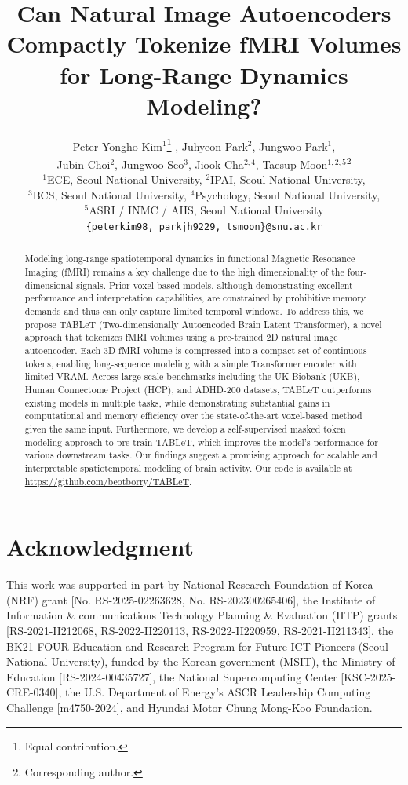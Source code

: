 \documentclass[10pt,twocolumn,letterpaper]{article}
\title{Can Natural Image Autoencoders Compactly Tokenize fMRI Volumes \\for Long-Range Dynamics Modeling?}
\author{Peter Yongho Kim$^{1}$\thanks{Equal contribution.} , Juhyeon Park$^{2}$\footnotemark[1] , Jungwoo Park$^{1}$, \\Jubin Choi$^{2}$, Jungwoo Seo$^{3}$, Jiook Cha$^{2,4}$, Taesup Moon$^{1,2,5}$\thanks{Corresponding author.} \\
$^{1}$ECE, Seoul National University,
$^{2}$IPAI, Seoul National University, \\
$^{3}$BCS, Seoul National University,
$^{4}$Psychology, Seoul National University, \\
$^{5}$ASRI / INMC / AIIS, Seoul National University\\
\texttt{\{peterkim98, parkjh9229, tsmoon\}@snu.ac.kr} \\
}
\newcommand{\ours}{TABLeT}
\begin{document}
\maketitle


\begin{abstract}
Modeling long-range spatiotemporal dynamics in functional Magnetic Resonance Imaging (fMRI) remains a key challenge due to the high dimensionality of the four-dimensional signals. 
Prior voxel-based models, although demonstrating excellent performance and interpretation capabilities, are constrained by prohibitive memory demands and thus can only capture limited temporal windows. 
To address this, we propose TABLeT (Two-dimensionally Autoencoded Brain Latent Transformer), a novel approach that tokenizes fMRI volumes using a pre-trained 2D natural image autoencoder. Each 3D fMRI volume is compressed into a compact set of continuous tokens, enabling long-sequence modeling with a simple Transformer encoder with limited VRAM. Across large-scale benchmarks including the UK-Biobank (UKB), Human Connectome Project (HCP), and ADHD-200 datasets, TABLeT outperforms existing models in multiple tasks, while demonstrating substantial gains in computational and memory efficiency over the state-of-the-art voxel-based method given the same input. 
Furthermore, we develop a self-supervised masked token modeling approach to pre-train {\ours}, which improves the model's performance for various downstream tasks.
Our findings suggest a promising approach for scalable and interpretable spatiotemporal modeling of brain activity.
Our code is available at \url{https://github.com/beotborry/TABLeT}.
\end{abstract}







\section*{Acknowledgment}
This work was supported in part by National Research Foundation of Korea (NRF) grant
[No. RS-2025-02263628, No. RS-202300265406], the Institute of Information \& communications Technology Planning
\& Evaluation (IITP) grants [RS-2021-II212068, RS-2022-II220113, RS-2022-II220959, RS-2021-II211343], the BK21 FOUR Education and
Research Program for Future ICT Pioneers (Seoul
National University), funded by the Korean government (MSIT), the Ministry of Education [RS-2024-00435727], the National Supercomputing Center [KSC-2025-CRE-0340], the U.S. Department of Energy’s ASCR Leadership Computing Challenge [m4750-2024], and Hyundai Motor Chung Mong-Koo Foundation.


{
    \small
    
    
}

% 
\appendix

\end{document}
